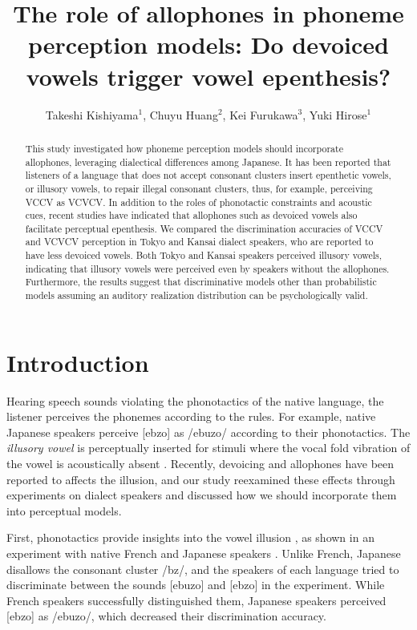\documentclass[a4paper,11pt,twocolumn]{article}
\title{The role of allophones in phoneme perception models: Do devoiced vowels trigger vowel epenthesis?}
\author{
    Takeshi Kishiyama$^1$,
    Chuyu Huang$^2$,
    Kei Furukawa$^3$,
    Yuki Hirose$^1$}
\begin{document}
\maketitle

\begin{abstract}
This study investigated how phoneme perception models should incorporate allophones, leveraging dialectical differences among Japanese. It has been reported that listeners of a language that does not accept consonant clusters insert epenthetic vowels, or illusory vowels, to repair illegal consonant clusters, thus, for example, perceiving VCCV as VCVCV. In addition to the roles of phonotactic constraints and acoustic cues, recent studies have indicated that allophones such as devoiced vowels also facilitate perceptual epenthesis. We compared the discrimination accuracies of VCCV and VCVCV perception in Tokyo and Kansai dialect speakers, who are reported to have less devoiced vowels. Both Tokyo and Kansai speakers perceived illusory vowels, indicating that illusory vowels were perceived even by speakers without the allophones. Furthermore, the results suggest that discriminative models other than probabilistic models assuming an auditory realization distribution can be psychologically valid.
\end{abstract}


\section{Introduction}

Hearing speech sounds violating the phonotactics of the native language, the listener perceives the phonemes according to the rules. For example, native Japanese speakers perceive [ebzo] as /ebuzo/ according to their phonotactics. The \textit{illusory vowel} is perceptually inserted for stimuli where the vocal fold vibration of the vowel is acoustically absent \cite{dupoux1999epentheticvi, dupoux2011illusory}. Recently, devoicing and allophones have been reported to affects the illusion, and our study reexamined these effects through experiments on dialect speakers and discussed how we should incorporate them into perceptual models.

First, phonotactics provide insights into the vowel illusion \cite{dupoux1999epentheticvi, halle2014special, monahan2009not, mattingley2015influence, guevara2017predicting, guevara2017epenthetic}, as shown in an experiment with native French and Japanese speakers \cite{dupoux1999epentheticvi}. Unlike French, Japanese disallows the consonant cluster /bz/, and the speakers of each language tried to discriminate between the sounds [ebuzo] and [ebzo] in the experiment. While French speakers successfully distinguished them, Japanese speakers perceived [ebzo] as /ebuzo/, which decreased their discrimination accuracy.
\end{document}
